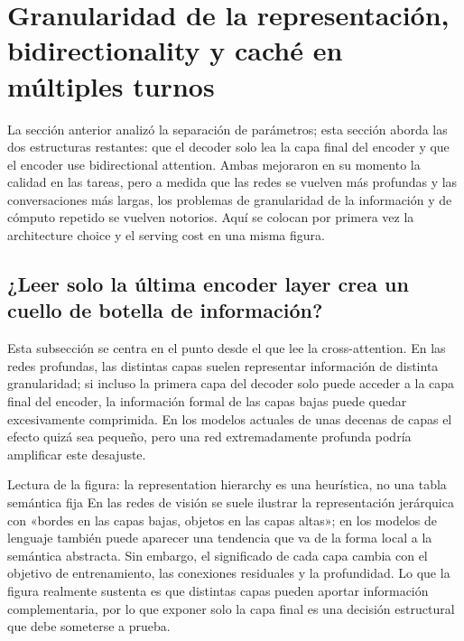 \section{Granularidad de la representación, bidirectionality y caché en múltiples turnos}

La sección anterior analizó la separación de parámetros; esta sección aborda las dos estructuras restantes: que el decoder solo lea la capa final del encoder y que el encoder use bidirectional attention. Ambas mejoraron en su momento la calidad en las tareas, pero a medida que las redes se vuelven más profundas y las conversaciones más largas, los problemas de granularidad de la información y de cómputo repetido se vuelven notorios. Aquí se colocan por primera vez la architecture choice y el serving cost en una misma figura.

\subsection{¿Leer solo la última encoder layer crea un cuello de botella de información?}

Esta subsección se centra en el punto desde el que lee la cross-attention. En las redes profundas, las distintas capas suelen representar información de distinta granularidad; si incluso la primera capa del decoder solo puede acceder a la capa final del encoder, la información formal de las capas bajas puede quedar excesivamente comprimida. En los modelos actuales de unas decenas de capas el efecto quizá sea pequeño, pero una red extremadamente profunda podría amplificar este desajuste.




\begin{knowledgebox}{Lectura de la figura: la representation hierarchy es una heurística, no una tabla semántica fija}
En las redes de visión se suele ilustrar la representación jerárquica con «bordes en las capas bajas, objetos en las capas altas»; en los modelos de lenguaje también puede aparecer una tendencia que va de la forma local a la semántica abstracta. Sin embargo, el significado de cada capa cambia con el objetivo de entrenamiento, las conexiones residuales y la profundidad. Lo que la figura realmente sustenta es que distintas capas pueden aportar información complementaria, por lo que exponer solo la capa final es una decisión estructural que debe someterse a prueba.
\end{knowledgebox}

